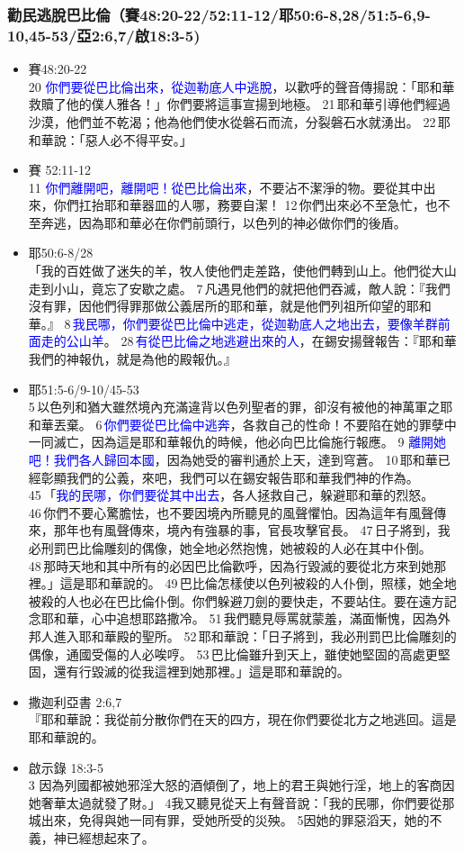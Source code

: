 \subsubsection{勸民逃脫巴比倫（賽48:20-22/52:11-12/耶50:6-8,28/51:5-6,9-10,45-53/亞2:6,7/啟18:3-5)}
\begin{itemize}
\item 賽48:20-22\\
20  \textcolor{blue}{你們要從巴比倫出來，從迦勒底人中逃脫}，以歡呼的聲音傳揚說：「耶和華救贖了他的僕人雅各！」你們要將這事宣揚到地極。 21 耶和華引導他們經過沙漠，他們並不乾渴；他為他們使水從磐石而流，分裂磐石水就湧出。 22 耶和華說：「惡人必不得平安。」
\item 賽 52:11-12\\
11 \textcolor{blue}{你們離開吧，離開吧！從巴比倫出來}，不要沾不潔淨的物。要從其中出來，你們扛抬耶和華器皿的人哪，務要自潔！ 12 你們出來必不至急忙，也不至奔逃，因為耶和華必在你們前頭行，以色列的神必做你們的後盾。
\item 耶50:6-8/28\\
「我的百姓做了迷失的羊，牧人使他們走差路，使他們轉到山上。他們從大山走到小山，竟忘了安歇之處。 7 凡遇見他們的就把他們吞滅，敵人說：『我們沒有罪，因他們得罪那做公義居所的耶和華，就是他們列祖所仰望的耶和華。』 8 \textcolor{blue}{我民哪，你們要從巴比倫中逃走，從迦勒底人之地出去，要像羊群前面走的公山羊}。
28 \textcolor{blue}{有從巴比倫之地逃避出來的人}，在錫安揚聲報告：『耶和華我們的神報仇，就是為他的殿報仇。』
\item 耶51:5-6/9-10/45-53\\
5 以色列和猶大雖然境內充滿違背以色列聖者的罪，卻沒有被他的神萬軍之耶和華丟棄。 6 \textcolor{blue}{你們要從巴比倫中逃奔}，各救自己的性命！不要陷在她的罪孽中一同滅亡，因為這是耶和華報仇的時候，他必向巴比倫施行報應。
9 \textcolor{blue}{離開她吧！我們各人歸回本國}，因為她受的審判通於上天，達到穹蒼。 10 耶和華已經彰顯我們的公義，來吧，我們可以在錫安報告耶和華我們神的作為。
45 「\textcolor{blue}{我的民哪，你們要從其中出去}，各人拯救自己，躲避耶和華的烈怒。 46 你們不要心驚膽怯，也不要因境內所聽見的風聲懼怕。因為這年有風聲傳來，那年也有風聲傳來，境內有強暴的事，官長攻擊官長。 47 日子將到，我必刑罰巴比倫雕刻的偶像，她全地必然抱愧，她被殺的人必在其中仆倒。 48 那時天地和其中所有的必因巴比倫歡呼，因為行毀滅的要從北方來到她那裡。」這是耶和華說的。 49 巴比倫怎樣使以色列被殺的人仆倒，照樣，她全地被殺的人也必在巴比倫仆倒。你們躲避刀劍的要快走，不要站住。要在遠方記念耶和華，心中追想耶路撒冷。 51 我們聽見辱罵就蒙羞，滿面慚愧，因為外邦人進入耶和華殿的聖所。 52 耶和華說：「日子將到，我必刑罰巴比倫雕刻的偶像，通國受傷的人必唉哼。 53 巴比倫雖升到天上，雖使她堅固的高處更堅固，還有行毀滅的從我這裡到她那裡。」這是耶和華說的。
\item 撒迦利亞書 2:6,7\\
『耶和華說：我從前分散你們在天的四方，現在你們要從北方之地逃回。這是耶和華說的。
\item 啟示錄 18:3-5\\
3 因為列國都被她邪淫大怒的酒傾倒了，地上的君王與她行淫，地上的客商因她奢華太過就發了財。」 4我又聽見從天上有聲音說：「我的民哪，你們要從那城出來，免得與她一同有罪，受她所受的災殃。 5因她的罪惡滔天，她的不義，神已經想起來了。
\end{itemize}


